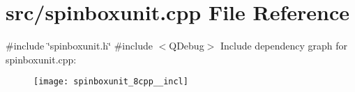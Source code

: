 \section{src/spinboxunit.cpp File Reference}
\label{spinboxunit_8cpp}
{\ttfamily \#include \char`\"{}spinboxunit.\+h\char`\"{}}\newline
{\ttfamily \#include $<$Q\+Debug$>$}\newline
Include dependency graph for spinboxunit.\+cpp\+:\nopagebreak
\begin{figure}[H]
\begin{center}
\leavevmode
\texttt{[image: spinboxunit\_8cpp\_\_incl]}
\end{center}
\end{figure}

